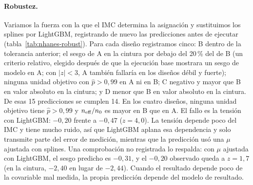\paragraph{Robustez.} Variamos la fuerza con la que el IMC determina la asignación y sustituimos los splines por LightGBM, registrando de nuevo las predicciones antes de ejecutar (tabla~\ref{tab:nhanes-robust}). Para cada diseño registramos cinco: B dentro de la tolerancia anterior; el sesgo de A en la cintura por debajo del 20\,\% del de B (un criterio relativo, elegido después de que la ejecución base mostrara un sesgo de modelo en A; con $|z|<3$, A también fallaría en los diseños débil y fuerte); ninguna unidad objetivo con $\hat p>0,99$ en A ni en B; C negativo y mayor que B en valor absoluto en la cintura; y D menor que B en valor absoluto en la cintura. De esas 15 predicciones se cumplen 14. En los cuatro diseños, ninguna unidad objetivo tiene $\hat p>0,99$ y $n_{\mathrm{eff}}/n_0$ es mayor en B que en A. El fallo es la tensión con LightGBM: $-0,20$ frente a $-0,47$ ($z=4,0$). La tensión depende poco del IMC y tiene mucho ruido, así que LightGBM aplana esa dependencia y solo transmite parte del error de medición, mientras que la predicción usó una $\mu$ ajustada con splines. Una comprobación no registrada lo respalda: con $\mu$ ajustada con LightGBM, el sesgo predicho es $-0,31$, y el $-0,20$ observado queda a $z=1,7$ (en la cintura, $-2,40$ en lugar de $-2,44$). Cuando el resultado depende poco de la covariable mal medida, la propia predicción depende del modelo de resultado.
